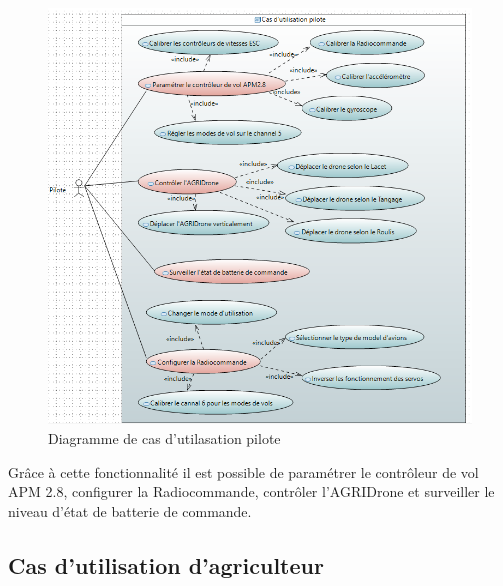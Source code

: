 		\begin{figure}[h] 
		\begin{center} 
			\centering
		\includegraphics{Images/Diagramme de cas d'utilisation pilote}
		\end{center}
		
		\caption{Diagramme de cas d'utilasation pilote}
		\end{figure}
		
		
		Grâce à cette fonctionnalité il est possible de  paramétrer le contrôleur de vol APM 2.8, configurer la Radiocommande, contrôler l’AGRIDrone et surveiller le niveau d'état de batterie de commande.
		\newpage
		\subsection{Cas d'utilisation d'agriculteur }
		
